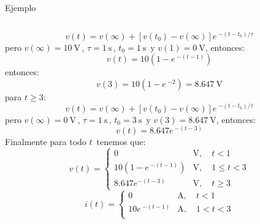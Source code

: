\documentclass[aspectratio=169]{beamer}
\begin{document}
\begin{frame}{Ejemplo}
\begin{columns}[onlytextwidth]
\begin{column}{0.5\textwidth}
{{            \begin{equation*}
                v(t)= v(\infty) + [v(t_0)-v(\infty)]e\,^{-(t - t_0)/ \tau}          
            \end{equation*}
            }
            {pero $v(\infty) = \SI{10}{\volt}\,$, $\tau=\SI{1}{\second}\,$, $t_0 = \SI{1}{\second}\,$ y $v(1)=\SI{0}{\volt}$, entonces: 
            \begin{equation*}
                v(t)=10\left(1-e\,^{-(t - 1)}\right)         
            \end{equation*}
            }
            {entonces: 
            \begin{equation*}
                v(3)=10\left(1-e\,^{-2}\right)=\SI{8.647}{\volt}      
            \end{equation*}
            }
        }
            {
            {para $t \geq 3$:
            \begin{equation*}
                v(t)= v(\infty) + [v(t_0)-v(\infty)]e\,^{-(t - t_0)/ \tau}          
            \end{equation*}
            }
            {pero $v(\infty) = \SI{0}{\volt}\,$, $\tau=\SI{1}{\second}\,$, $t_0 = \SI{3}{\second}\,$ y $v(3)=\SI{8.647}{\volt}$, entonces: 
            \begin{equation*}
                v(t)=8.647e\,^{-(t - 3)}        
            \end{equation*}
            }
        }
            {
            {Finalmente para todo $t\,$ tenemos que:
            \begin{equation*}
                v(t) =
                \begin{cases}
                    0 &\si{\volt},\quad t < 1\\
                    10\left(1-e\,^{-(t-1)}\right) &\si{\volt},\quad 1 \leq t < 3\\
                    8.647e^{-(t-3)} &\si{\volt},\quad t \geq 3
                \end{cases}
            \end{equation*}
            }
            {\begin{equation*}
                i(t) =
                \begin{cases}
                    0 &\si{\ampere},\quad t < 1\\
                    10e\,^{-(t-1)} &\si{\ampere},\quad 1 < t < 3\\

\end{cases}
\end{equation*}}}
\end{column}
\end{columns}
\end{frame}
\end{document}
